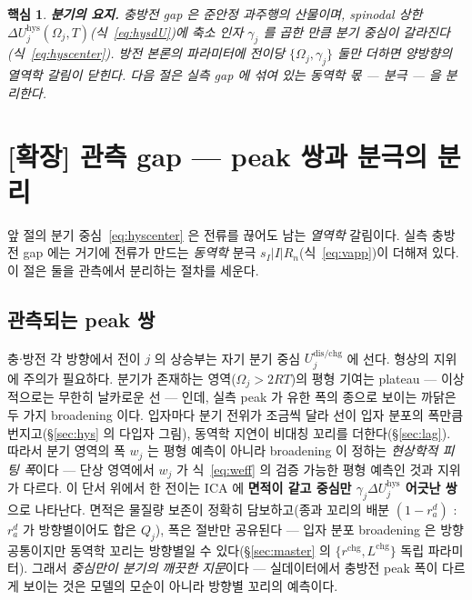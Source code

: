 \documentclass[11pt,a4paper]{article}
\newtheorem*{keybox}{핵심}
\newcommand{\dis}{\mathrm{dis}}
\newcommand{\chg}{\mathrm{chg}}
\newcommand{\hys}{\mathrm{hys}}
\begin{document}
\begin{keybox}
\textbf{분기의 요지.} 충방전 gap 은 준안정 과주행의 산물이며, spinodal 상한
$\Delta U_j^\hys(\Omega_j,T)$(식~\eqref{eq:hysdU})에 축소 인자 $\gamma_j$ 를 곱한 만큼 분기 중심이
갈라진다(식~\eqref{eq:hyscenter}). 방전 본론의 파라미터에 전이당 $\{\Omega_j,\gamma_j\}$ 둘만 더하면
양방향의 \emph{열역학} 갈림이 닫힌다. 다음 절은 실측 gap 에 섞여 있는 \emph{동역학} 몫 — 분극 — 을
분리한다.
\end{keybox}

\section{[확장] 관측 gap — peak 쌍과 분극의 분리}\label{sec:hyspol}
앞 절의 분기 중심~\eqref{eq:hyscenter} 은 전류를 끊어도 남는 \emph{열역학} 갈림이다. 실측
충방전 gap 에는 거기에 전류가 만드는 \emph{동역학} 분극 $s_I|I|R_n$(식~\eqref{eq:vapp})이 더해져
있다. 이 절은 둘을 관측에서 분리하는 절차를 세운다.

\subsection{관측되는 peak 쌍}\label{sec:hyspeak}
충$\cdot$방전 각 방향에서 전이 $j$ 의 상승부는 자기 분기 중심 $U_j^{\dis/\chg}$ 에 선다. 형상의 지위에
주의가 필요하다. 분기가 존재하는 영역($\Omega_j>2RT$)의 평형 기여는 plateau — 이상적으로는 무한히 날카로운
선 — 인데, 실측 peak 가 유한 폭의 종으로 보이는 까닭은 두 가지 broadening 이다. 입자마다 분기 전위가
조금씩 달라 선이 입자 분포의 폭만큼 번지고(\S\ref{sec:hys} 의 다입자 그림), 동역학 지연이 비대칭 꼬리를
더한다(\S\ref{sec:lag}). 따라서 분기 영역의 폭 $w_j$ 는 평형 예측이 아니라 broadening 이 정하는
\emph{현상학적 피팅 폭}이다 — 단상 영역에서 $w_j$ 가 식~\eqref{eq:weff} 의 검증 가능한 평형 예측인 것과
지위가 다르다. 이 단서 위에서 한 전이는 ICA 에 \textbf{면적이 같고 중심만 $\gamma_j\Delta U_j^\hys$ 어긋난
쌍}으로 나타난다. 면적은 물질량 보존이 정확히 담보하고(종과 꼬리의 배분 $(1-r_a^d)$ : $r_a^d$ 가 방향별이어도
합은 $Q_j$), 폭은 절반만 공유된다 — 입자 분포 broadening 은 방향 공통이지만 동역학 꼬리는 방향별일 수
있다(\S\ref{sec:master} 의 $\{r^{\chg},L^{\chg}\}$ 독립 파라미터). 그래서 \emph{중심만이 분기의
깨끗한 지문}이다 — 실데이터에서 충방전 peak 폭이 다르게 보이는 것은 모델의 모순이 아니라 방향별
꼬리의 예측이다.
\end{document}
